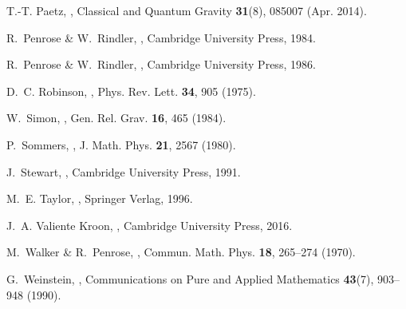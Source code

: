 \documentclass[10pt,a4paper]{article}
\theoremstyle{plain}
\begin{document}
\begin{thebibliography}{10}
T.-T. {Paetz},
,
\newblock Classical and Quantum Gravity {\bf 31}(8), 085007 (Apr. 2014).

R.~Penrose \& W.~Rindler,
,
\newblock Cambridge University Press, 1984.

R.~Penrose \& W.~Rindler,
,
\newblock Cambridge University Press, 1986.

D.~C. Robinson,
,
\newblock Phys. Rev. Lett. {\bf 34}, 905 (1975).

W.~Simon,
,
\newblock Gen. Rel. Grav. {\bf 16}, 465 (1984).

P.~Sommers,
,
\newblock J. Math. Phys. {\bf 21}, 2567 (1980).

J.~Stewart,
,
\newblock Cambridge University Press, 1991.

M.~E. Taylor,
,
\newblock Springer Verlag, 1996.

J.~A. {Valiente Kroon},
,
\newblock Cambridge University Press, 2016.

M.~Walker \& R.~Penrose,
,
\newblock Commun. Math. Phys. {\bf 18}, 265--274 (1970).

G.~Weinstein,
,
\newblock Communications on Pure and Applied Mathematics {\bf 43}(7), 903--948
  (1990).

\end{thebibliography}
\end{document}
